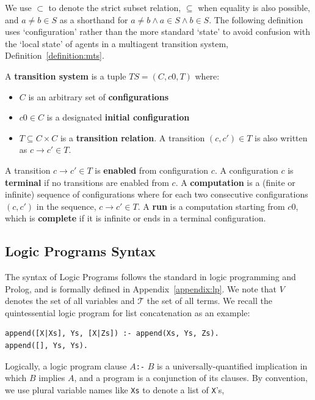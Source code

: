 \documentclass[runningheads,thm-restate]{llncs}
\newcommand{\temph}[1]{\textbf{#1}}  %
\newcommand{\calT}{\mathcal{T}}
\begin{document}
We use $\subset$ to denote the strict subset relation, $\subseteq$ when equality is also possible, and $a\ne b \in S$ as a shorthand for $a\ne b\wedge a\in S \wedge b\in S$.
%
The following definition uses `configuration' rather than the more standard `state'  to avoid confusion with the `local state' of agents in a multiagent transition system, Definition~\ref{definition:mts}.

\begin{definition}\label{definition:ts}
A \temph{transition system} is a tuple $TS = (C, c0, T)$ where:
\begin{itemize}
    \item $C$ is an arbitrary set of \temph{configurations}
    \item $c0 \in C$ is a designated \temph{initial configuration}
    \item $T \subseteq C \times C$ is a \temph{transition relation}. A transition $(c,c') \in T$ is also written as $c \rightarrow c' \in T$.
\end{itemize}
A transition $c \rightarrow c' \in T$ is \temph{enabled} from configuration $c$. A configuration $c$ is \temph{terminal} if no transitions are enabled from $c$. A \temph{computation} is a (finite or infinite) sequence of configurations where for each two consecutive configurations $(c,c')$ in the sequence, $c \rightarrow c' \in T$. A \temph{run} is a computation starting from $c0$, which is \temph{complete} if it is infinite or ends in a terminal configuration.
\end{definition}


\subsection{Logic Programs Syntax}

The syntax of Logic Programs follows the standard in logic programming and Prolog, and is formally defined in Appendix~\ref{appendix:lp}. We note that $V$ denotes the set of all variables and $\calT$ the set of all terms.
We recall the quintessential logic program for list concatenation as an example:
\begin{example}[Append]
\begin{verbatim}
append([X|Xs], Ys, [X|Zs]) :- append(Xs, Ys, Zs).
append([], Ys, Ys).
\end{verbatim}
Logically, a logic program clause $A$\verb|:-| $B$ is a universally-quantified implication in which $B$ implies $A$, and a program is a conjunction of its clauses.
By convention, we use plural variable names like \verb|Xs| to denote a list of \verb|X|'s, 
\end{example}
\end{document}
